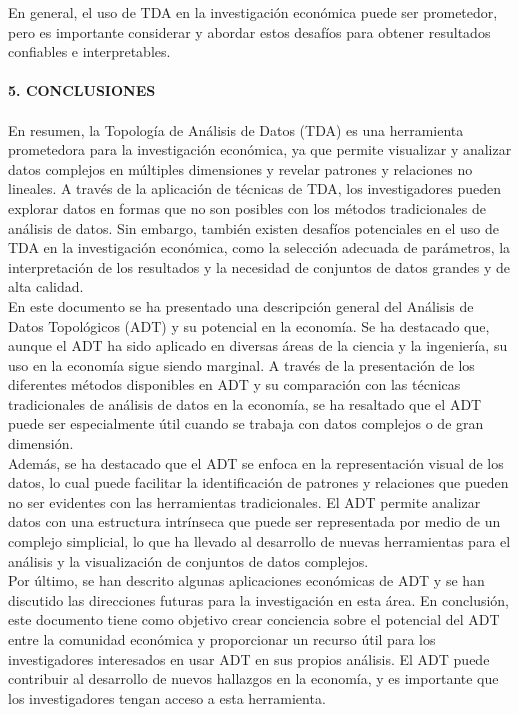 En general, el uso de TDA en la investigación económica puede ser prometedor, pero es importante considerar y abordar estos desafíos para obtener resultados confiables e interpretables.\\\\

\textbf{5. CONCLUSIONES}\\\\

En resumen, la Topología de Análisis de Datos (TDA) es una herramienta prometedora para la investigación económica, ya que permite visualizar y analizar datos complejos en múltiples dimensiones y revelar patrones y relaciones no lineales. A través de la aplicación de técnicas de TDA, los investigadores pueden explorar datos en formas que no son posibles con los métodos tradicionales de análisis de datos. Sin embargo, también existen desafíos potenciales en el uso de TDA en la investigación económica, como la selección adecuada de parámetros, la interpretación de los resultados y la necesidad de conjuntos de datos grandes y de alta calidad.\\

En este documento se ha presentado una descripción general del Análisis de Datos Topológicos (ADT) y su potencial en la economía. Se ha destacado que, aunque el ADT ha sido aplicado en diversas áreas de la ciencia y la ingeniería, su uso en la economía sigue siendo marginal. A través de la presentación de los diferentes métodos disponibles en ADT y su comparación con las técnicas tradicionales de análisis de datos en la economía, se ha resaltado que el ADT puede ser especialmente útil cuando se trabaja con datos complejos o de gran dimensión.\\

Además, se ha destacado que el ADT se enfoca en la representación visual de los datos, lo cual puede facilitar la identificación de patrones y relaciones que pueden no ser evidentes con las herramientas tradicionales. El ADT permite analizar datos con una estructura intrínseca que puede ser representada por medio de un complejo simplicial, lo que ha llevado al desarrollo de nuevas herramientas para el análisis y la visualización de conjuntos de datos complejos.\\

Por último, se han descrito algunas aplicaciones económicas de ADT y se han discutido las direcciones futuras para la investigación en esta área. En conclusión, este documento tiene como objetivo crear conciencia sobre el potencial del ADT entre la comunidad económica y proporcionar un recurso útil para los investigadores interesados en usar ADT en sus propios análisis. El ADT puede contribuir al desarrollo de nuevos hallazgos en la economía, y es importante que los investigadores tengan acceso a esta herramienta.\\







